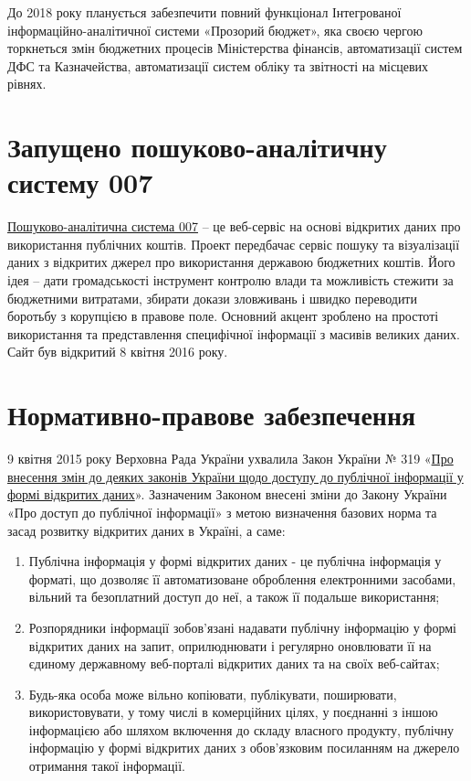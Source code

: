 До 2018 року планується забезпечити повний функціонал Інтегрованої інформаційно-аналітичної системи «Прозорий бюджет», яка своєю чергою торкнеться змін бюджетних процесів Міністерства фінансів, автоматизації систем ДФС та Казначейства, автоматизації систем обліку та звітності на місцевих рівнях.

\section{Запущено пошуково-аналітичну систему 007}

\href{https://www.facebook.com/pointOOSeven}{Пошуково-аналітична система 007} – це веб-сервіс на основі відкритих даних про використання публічних коштів. Проект передбачає сервіс пошуку та візуалізації даних з відкритих джерел про використання державою бюджетних коштів. Його ідея – дати громадськості інструмент контролю влади та можливість стежити за бюджетними витратами, збирати докази зловживань і швидко переводити боротьбу з корупцією в правове поле. Основний акцент зроблено на простоті використання та представлення специфічної інформації з масивів великих даних. Сайт був відкритий 8 квітня 2016 року.

\section{Нормативно-правове забезпечення}

9 квітня 2015 року Верховна Рада України ухвалила Закон України № 319 «\href{http://zakon3.rada.gov.ua/laws/show/319-19}{Про внесення змін до деяких законів України щодо доступу до публічної інформації у формі відкритих даних}». Зазначеним Законом внесені зміни до Закону України «Про доступ до публічної інформації» з метою визначення базових норма та засад розвитку відкритих даних в Україні, а саме:

\begin{enumerate}
    \item Публічна інформація у формі відкритих даних - це публічна інформація у форматі, що дозволяє її автоматизоване оброблення електронними засобами, вільний та безоплатний доступ до неї, а також її подальше використання;
    \item Розпорядники інформації зобов'язані надавати публічну інформацію у формі відкритих даних на запит, оприлюднювати і регулярно оновлювати її на єдиному державному веб-порталі відкритих даних та на своїх веб-сайтах;
    \item Будь-яка особа може вільно копіювати, публікувати, поширювати, використовувати, у тому числі в комерційних цілях, у поєднанні з іншою інформацією або шляхом включення до складу власного продукту, публічну інформацію у формі відкритих даних з обов'язковим посиланням на джерело отримання такої інформації.
\end{enumerate}

